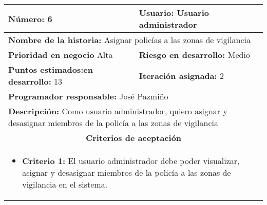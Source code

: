 \begin{longtable}{|p{6.7cm}|p{6.7cm}|}
    \textbf{Número:} 6                                   & \textbf{Usuario:} Usuario administrador                                                               \\
    \hline
    \multicolumn{2}{|l|}{\textbf{Nombre de la historia:} Asignar policías a las zonas de vigilancia}                                                             \\
    \hline
    \textbf{Prioridad en negocio}  Alta                  & \textbf{Riesgo en desarrollo:} Medio                                                                  \\
    \hline
    \textbf{\textbf{Puntos estimados:}en desarrollo:} 13 & \textbf{Iteración asignada:} 2                                                                        \\
    \hline
    \multicolumn{2}{|l|}{\textbf{Programador responsable:} José Pazmiño }                                                                                        \\
    \hline
    \multicolumn{2}{|p{13.4cm}|}{\textbf{Descripción:} Como usuario administrador, quiero asignar y desasignar miembros de la policía a las zonas de vigilancia} \\
    \hline
    \multicolumn{2}{|c|}{\textbf{Criterios de aceptación}}                                                                                                       \\
    \hline
    \multicolumn{2}{|p{13.4cm}|}{
    \begin{itemize}[label={},leftmargin=*, nosep]
        \item \textbf{Criterio 1:} El usuario administrador debe poder visualizar, asignar y desasignar miembros de la policía a las zonas de vigilancia en el sistema.
    \end{itemize}
    }                                                                                                                                                            \\
\end{longtable}




